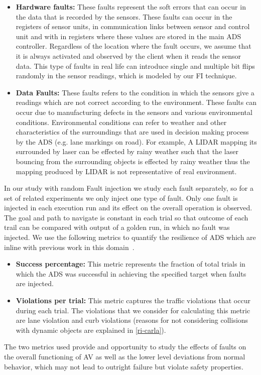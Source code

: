 \begin{itemize}
	\item \textbf{Hardware faults:} These faults represent the soft errors that can occur in the data that is recorded by the sensors. These faults can occur in the registers of sensor units, in communication links between sensor and control unit and with in registers where these values are stored in the main ADS controller. Regardless of the location where the fault occurs, we assume that it is always activated and observed by the client when it reads the sensor data. This type of faults in real life can introduce single and multiple bit flips randomly in the sensor readings, which is modeled by our FI technique.
	
	\item \textbf{Data Faults:} These faults refers to the condition in which the sensors give a readings which are not correct according to the environment. These faults can occur due to manufacturing defects in the sensors and various environmental conditions. Environmental conditions can refer to weather and other characteristics of the surroundings that are used in decision making process by the ADS (e.g. lane markings on road). For example, A LIDAR mapping its surrounded by laser can be effected by rainy weather such that the laser bouncing from the surrounding objects is effected by rainy weather thus the mapping produced by LIDAR is not representative of real environment.
	
\end{itemize}

In our study with random Fault injection we study each fault separately, so for a set of related experiments we only inject one type of fault. Only one fault is injected in each execution run and its effect on the overall operation is observed. The goal and path to navigate is constant in each trial so that outcome of each trail can be compared with output of a golden run, in which no fault was injected. We use the following metrics to quantify the resilience of ADS which are inline with previous work in this domain~\cite{avfi}.

\begin{itemize}
	\item \textbf{Success percentage:} This metric represents the fraction of total trials in which the ADS was successful in achieving the specified target when faults are injected.
	 
	\item \textbf{Violations per trial:} This metric captures the traffic violations that occur during each trial. The violations that we consider for calculating this metric are lane violation and curb violations (reasons for not considering collisions with dynamic objects are explained in \ref{ri-carla}). 
	
\end{itemize}

The two metrics used provide and opportunity to study the effects of faults on the overall functioning of AV as well as the lower level deviations from normal behavior, which may not lead to outright failure but violate safety properties.
